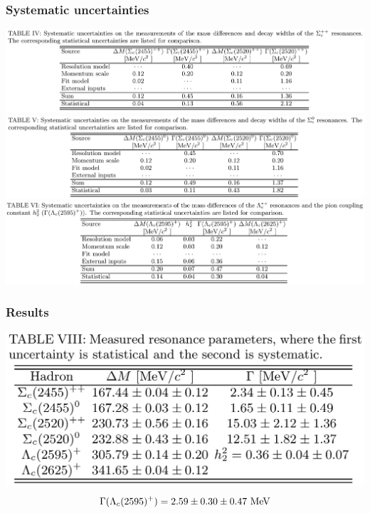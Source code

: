 \documentclass[10pt]{beamer}
\begin{document}
\begin{frame}[label=syst]%
  \frametitle{Systematic uncertainties}
  \centering
  \includegraphics[width=.95\textwidth]{figures/001/syst-Scpp}
  \includegraphics[width=.95\textwidth]{figures/001/syst-Scz}
  \includegraphics[width=.95\textwidth]{figures/001/syst-Lc}

\end{frame}%

\begin{frame}[label=results]%
  \frametitle{Results}
  \centering
  \includegraphics[width=.9\textwidth]{figures/001/results}
  $$ \Gamma(\Lambda_c(2595)^+) = 2.59 \pm 0.30 \pm 0.47 \text{\textrm{ MeV}} $$
\end{frame}%
\end{document}
